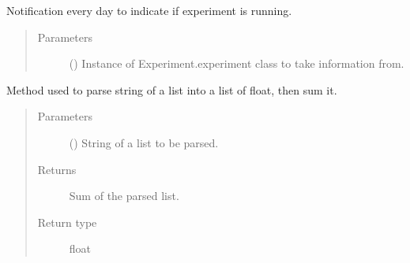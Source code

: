 \documentclass[letterpaper,10pt,english]{sphinxmanual}
\begin{document}

\begin{fulllineitems}
\label{\detokenize{NoSeMazeController/HelperFunctions:HelperFunctions.Email.deadmans_switch}}
\pysigstartsignatures
{}
\pysigstopsignatures
\sphinxAtStartPar
Notification every day to indicate if experiment is running.
\begin{quote}\begin{description}
\item[{Parameters}] \leavevmode
\sphinxAtStartPar
{} () \textendash{} Instance of Experiment.experiment class to take information from.

\end{description}\end{quote}

\end{fulllineitems}


\begin{fulllineitems}
\label{\detokenize{NoSeMazeController/HelperFunctions:HelperFunctions.Email.parse_list}}
\pysigstartsignatures
{}
\pysigstopsignatures
\sphinxAtStartPar
Method used to parse string of a list into a list of float, then sum it.
\begin{quote}\begin{description}
\item[{Parameters}] \leavevmode
\sphinxAtStartPar
{} () \textendash{} String of a list to be parsed.

\item[{Returns}] \leavevmode
\sphinxAtStartPar
{} \textendash{} Sum of the parsed list.

\item[{Return type}] \leavevmode
\sphinxAtStartPar
float

\end{description}\end{quote}

\end{fulllineitems}
\end{document}
